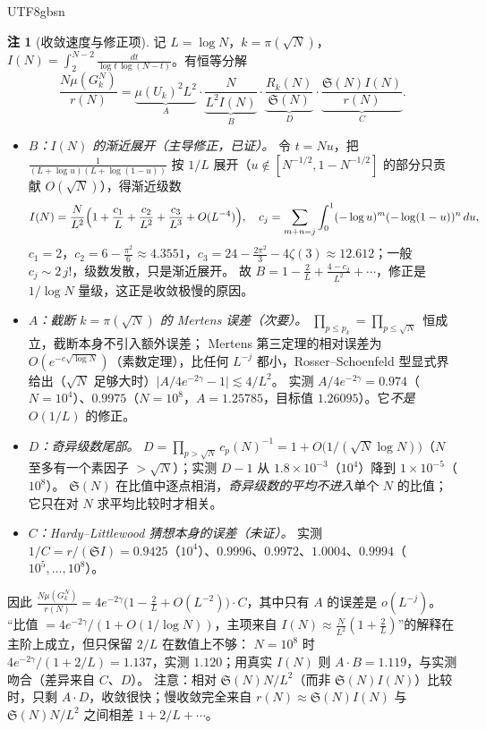 \documentclass[11pt,a4paper]{article}
\newcommand{\Haar}{\mu}
\newcommand{\Sing}{\mathfrak S}
\theoremstyle{plain}
\theoremstyle{definition}
\newtheorem{rem}[prop]{注}
\begin{document}
\begin{CJK}{UTF8}{gbsn}
\begin{rem}[收敛速度与修正项]\label{rem:mertensrate}
记 $L=\log N$，$k=\pi(\sqrt N)$，$I(N)=\int_2^{N-2}\frac{dt}{\log t\,\log(N-t)}$。有恒等分解
\[
\frac{N\Haar(G_k^N)}{r(N)}
=\underbrace{\Haar(U_k)^2L^2}_{A}\cdot
\underbrace{\frac{N}{L^2I(N)}}_{B}\cdot
\underbrace{\frac{R_k(N)}{\Sing(N)}}_{D}\cdot
\underbrace{\frac{\Sing(N)I(N)}{r(N)}}_{C}.
\]
\begin{itemize}[leftmargin=*]
\item \emph{$B$：$I(N)$ 的渐近展开（主导修正，已证）。} 令 $t=Nu$，把 $\frac1{(L+\log u)(L+\log(1-u))}$ 按 $1/L$ 展开（$u\notin[N^{-1/2},1-N^{-1/2}]$ 的部分只贡献 $O(\sqrt N)$），得渐近级数
\[
I(N)=\frac N{L^2}\Bigl(1+\frac{c_1}{L}+\frac{c_2}{L^2}+\frac{c_3}{L^3}+O(L^{-4})\Bigr),\quad
c_j=\sum_{m+n=j}\int_0^1(-\log u)^m(-\log(1-u))^n\,du,
\]
$c_1=2$，$c_2=6-\frac{\pi^2}6\approx4.3551$，$c_3=24-\frac{2\pi^2}3-4\zeta(3)\approx12.612$；一般 $c_j\sim2\,j!$，级数发散，只是渐近展开。
故 $B=1-\frac2L+\frac{4-c_2}{L^2}+\cdots$，修正是 $1/\log N$ 量级，这正是收敛极慢的原因。
\item \emph{$A$：截断 $k=\pi(\sqrt N)$ 的 Mertens 误差（次要）。} $\prod_{p\le p_k}=\prod_{p\le\sqrt N}$ 恒成立，截断本身不引入额外误差；
Mertens 第三定理的相对误差为 $O(e^{-c\sqrt{\log N}})$（素数定理），比任何 $L^{-j}$ 都小，Rosser--Schoenfeld 型显式界给出（$\sqrt N$ 足够大时）$\lvert A/4e^{-2\gamma}-1\rvert\lesssim4/L^2$。
实测 $A/4e^{-2\gamma}=0.974$（$N=10^4$）、$0.9975$（$N=10^8$，$A=1.25785$，目标值 $1.26095$）。它\emph{不是} $O(1/L)$ 的修正。
\item \emph{$D$：奇异级数尾部。} $D=\prod_{p>\sqrt N}c_p(N)^{-1}=1+O\bigl(1/(\sqrt N\log N)\bigr)$（$N$ 至多有一个素因子 $>\sqrt N$）；实测 $D-1$ 从 $1.8\times10^{-3}$（$10^4$）降到 $1\times10^{-5}$（$10^8$）。
$\Sing(N)$ 在比值中逐点相消，\emph{奇异级数的平均不进入}单个 $N$ 的比值；它只在对 $N$ 求平均比较时才相关。
\item \emph{$C$：Hardy--Littlewood 猜想本身的误差（未证）。} 实测 $1/C=r/(\Sing I)=0.9425$（$10^4$）、$0.9996$、$0.9972$、$1.0004$、$0.9994$（$10^5,\dots,10^8$）。
\end{itemize}
因此 $\frac{N\Haar(G_k^N)}{r(N)}=4e^{-2\gamma}\bigl(1-\frac2L+O(L^{-2})\bigr)\cdot C$，其中只有 $A$ 的误差是 $o(L^{-j})$。
“比值 $=4e^{-2\gamma}/(1+O(1/\log N))$，主项来自 $I(N)\approx\frac N{L^2}(1+\frac2L)$”的解释在主阶上成立，但只保留 $2/L$ 在数值上不够：
$N=10^8$ 时 $4e^{-2\gamma}/(1+2/L)=1.137$，实测 $1.120$；用真实 $I(N)$ 则 $A\cdot B=1.119$，与实测吻合（差异来自 $C$、$D$）。
注意：相对 $\Sing(N)N/L^2$（而非 $\Sing(N)I(N)$）比较时，只剩 $A\cdot D$，收敛很快；慢收敛完全来自 $r(N)\approx\Sing(N)I(N)$ 与 $\Sing(N)N/L^2$ 之间相差 $1+2/L+\cdots$。


\end{rem}
\end{CJK}
\end{document}
